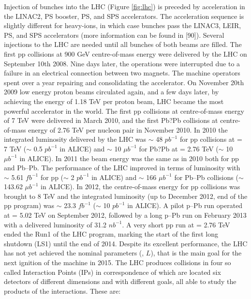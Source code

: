 Injection of bunches into the LHC (Figure \ref{fig:lhc}) is preceded by acceleration in the LINAC2, PS booster, PS, and SPS accelerators. The acceleration sequence is slightly different for heavy-ions, in which case bunches pass the LINAC3, LEIR, PS, and SPS accelerators (more information can be found in [90]). Several injections to the LHC are needed until all bunches of both beams are filled.
The first pp collisions at 900 GeV centre-of-mass energy were delivered by the LHC on September 10th 2008. Nine days later, the operations were interrupted due to a failure in an electrical connection between two magnets. The machine operators spent over a year repairing and consolidating the accelerator. On November 20th 2009 low energy proton beams circulated again, and a few days later, by achieving the energy of 1.18 TeV per proton beam, LHC became the most powerful accelerator in the world. The first pp collisions at centre-of-mass energy of 7 TeV were delivered in March 2010, and the first Pb?Pb collisions at centre-of-mass energy of 2.76 TeV per nucleon pair in November 2010. In 2010 the integrated luminosity delivered by the LHC was $\sim$ 48 $pb^{-1}$ for pp collisions at \s = 7 TeV ($\sim$ 0.5 $pb^{-1}$ in ALICE) and $\sim$ 10 $\mu b^{-1}$ for Pb?Pb at \snn = 2.76 TeV ($\sim$ 10 $\mu b^{-1}$ in ALICE). In 2011 the beam energy was the same as in 2010 both for pp and Pb--Pb. The performance of the LHC improved in terms of luminosity with $\sim$ 5.61 $fb^{-1}$ for pp ($\sim$ 2 $pb^{-1}$ in ALICE) and $\sim$ 166 $\mu b^{-1}$ for Pb--Pb collisions ($\sim$ 143.62 $\mu b^{-1}$ in ALICE). In 2012, the centre-of-mass energy for pp collisions was brought to 8 TeV and the integrated luminosity (up to December 2012, end of the pp program) was $\sim$ 23.3 $fb^{-1}$ ($\sim$ 10 $pb^{-1}$ in ALICE). A pilot p--Pb run operated at \snn = 5.02 TeV on September 2012, followed by a long p--Pb run on February 2013 with a delivered luminosity of 31.2 $nb^{-1}$. A very short pp run at \s = 2.76 TeV ended the Run1 of the LHC program, marking the start of the first long shutdown (LS1) until the end of 2014. Despite its excellent performance, the LHC has not yet achieved the nominal parameters (\s, $L$), that is the main goal for the next ignition of the machine in 2015. The LHC produces collisions in four so called Interaction Points (IPs) in correspondence of which are located six detectors of different dimensions and with different goals, all able to study the products of the interactions. These are: \\


